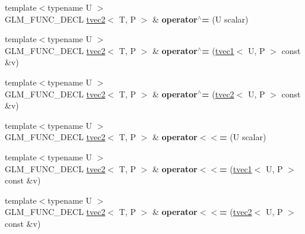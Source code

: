 \begin{DoxyCompactItemize}
\item 
\hypertarget{structglm_1_1tvec2_af338fe1420da86c655cb368cb8739667}{{\footnotesize template$<$typename U $>$ }\\G\-L\-M\-\_\-\-F\-U\-N\-C\-\_\-\-D\-E\-C\-L \hyperlink{structglm_1_1tvec2}{tvec2}$<$ T, P $>$ \& {\bfseries operator$^\wedge$=} (U scalar)}\label{structglm_1_1tvec2_af338fe1420da86c655cb368cb8739667}

\item 
\hypertarget{structglm_1_1tvec2_a50b26c0a009d0ed134ae0984da6d50ab}{{\footnotesize template$<$typename U $>$ }\\G\-L\-M\-\_\-\-F\-U\-N\-C\-\_\-\-D\-E\-C\-L \hyperlink{structglm_1_1tvec2}{tvec2}$<$ T, P $>$ \& {\bfseries operator$^\wedge$=} (\hyperlink{structglm_1_1tvec1}{tvec1}$<$ U, P $>$ const \&v)}\label{structglm_1_1tvec2_a50b26c0a009d0ed134ae0984da6d50ab}

\item 
\hypertarget{structglm_1_1tvec2_ac1398d1c0dbada005b4ed27a9a568c28}{{\footnotesize template$<$typename U $>$ }\\G\-L\-M\-\_\-\-F\-U\-N\-C\-\_\-\-D\-E\-C\-L \hyperlink{structglm_1_1tvec2}{tvec2}$<$ T, P $>$ \& {\bfseries operator$^\wedge$=} (\hyperlink{structglm_1_1tvec2}{tvec2}$<$ U, P $>$ const \&v)}\label{structglm_1_1tvec2_ac1398d1c0dbada005b4ed27a9a568c28}

\item 
\hypertarget{structglm_1_1tvec2_ab2fe3b9e925a30fea2ceac2b936fc93e}{{\footnotesize template$<$typename U $>$ }\\G\-L\-M\-\_\-\-F\-U\-N\-C\-\_\-\-D\-E\-C\-L \hyperlink{structglm_1_1tvec2}{tvec2}$<$ T, P $>$ \& {\bfseries operator$<$$<$=} (U scalar)}\label{structglm_1_1tvec2_ab2fe3b9e925a30fea2ceac2b936fc93e}

\item 
\hypertarget{structglm_1_1tvec2_a8f293425e914a1d7964907a89f6b492d}{{\footnotesize template$<$typename U $>$ }\\G\-L\-M\-\_\-\-F\-U\-N\-C\-\_\-\-D\-E\-C\-L \hyperlink{structglm_1_1tvec2}{tvec2}$<$ T, P $>$ \& {\bfseries operator$<$$<$=} (\hyperlink{structglm_1_1tvec1}{tvec1}$<$ U, P $>$ const \&v)}\label{structglm_1_1tvec2_a8f293425e914a1d7964907a89f6b492d}

\item 
\hypertarget{structglm_1_1tvec2_ad02c6fdf1c56884b2a65bf9135a28870}{{\footnotesize template$<$typename U $>$ }\\G\-L\-M\-\_\-\-F\-U\-N\-C\-\_\-\-D\-E\-C\-L \hyperlink{structglm_1_1tvec2}{tvec2}$<$ T, P $>$ \& {\bfseries operator$<$$<$=} (\hyperlink{structglm_1_1tvec2}{tvec2}$<$ U, P $>$ const \&v)}\label{structglm_1_1tvec2_ad02c6fdf1c56884b2a65bf9135a28870}


\end{DoxyCompactItemize}
